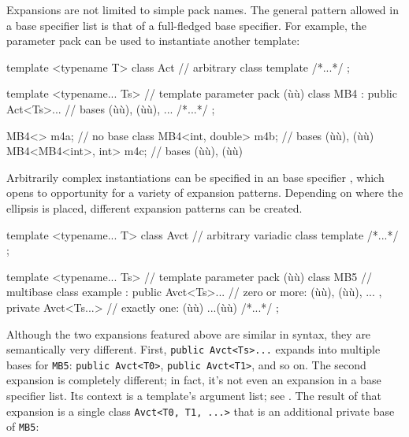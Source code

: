 \noindent Expansions are not limited to simple pack names. The general pattern
allowed in a base specifier list is that of a full-fledged base
specifier. For example, the parameter pack can be used to instantiate
another template:

\begin{emcppslisting}[emcppsbatch=e28]
template <typename T>
class Act                       // arbitrary class template
{ /*...*/ };

template <typename... Ts>       // template parameter pack (ù{}ù)
class MB4
    : public Act<Ts>...         // bases (ù{}ù), (ù{}ù), ...
{ /*...*/ };

MB4<>                     m4a;  // no base class
MB4<int, double>          m4b;  // bases (ù{}ù), (ù{}ù)
MB4<MB4<int>, int>        m4c;  // bases (ù{}ù), (ù{}ù)
\end{emcppslisting}
    

\noindent Arbitrarily complex instantiations can be specified in an base specifier
, which opens to opportunity for a variety of
expansion patterns. Depending on where the ellipsis is placed, different
expansion patterns can be created.

\begin{emcppslisting}[emcppsbatch=e28]
template <typename... T>
class Avct                 // arbitrary variadic class template
{ /*...*/ };

template <typename... Ts>  // template parameter pack (ù{}ù)
class MB5                  // multibase class example
: public Avct<Ts>...       // zero or more: (ù{}ù), (ù{}ù), ...
, private Avct<Ts...>      // exactly one: (ù{}ù) ...(ù{\codeincomments{>}}ù)
{ /*...*/ };
\end{emcppslisting}
    

\noindent Although the two expansions featured above are similar in syntax, they
are semantically very different. First,
\lstinline!public!~\lstinline!Avct<Ts>...! expands into multiple bases for
\lstinline!MB5!: \lstinline!public!~\lstinline!Avct<T0>!,
\lstinline!public!~\lstinline!Avct<T1>!, and so on. The second expansion is
completely different; in fact, it's not even an expansion in a base
specifier list. Its context is a template's argument list; see
. The result of
that expansion is a single class
\lstinline!Avct<T0,!~\lstinline!T1,!~\lstinline!...>! that is an additional
private base of \lstinline!MB5!:

